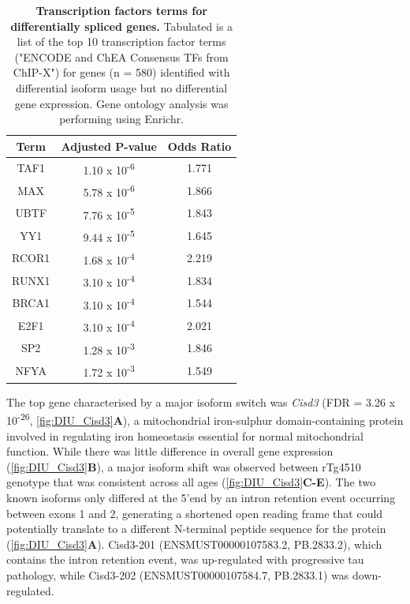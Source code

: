 \begin{table}[]
	\centering
	\captionsetup{width=0.95\textwidth,singlelinecheck=off}
	\caption[Transcription factors terms for differentially spliced genes]%
	{\textbf{Transcription factors terms for differentially spliced genes.} Tabulated is a list of the top 10 transcription factor terms ("ENCODE and ChEA Consensus TFs from ChIP-X") for genes (n = 580) identified with differential isoform usage but no differential gene expression. Gene ontology analysis was performing using Enrichr.}
	\label{tab: df_enrichr}
	\begin{tabular}{@{}ccc@{}}
		\toprule
		Term   & Adjusted P-value & Odds Ratio \\ \midrule
		TAF1   & 1.10 x 10\textsuperscript{-6}         & 1.771      \\
		MAX    & 5.78 x 10\textsuperscript{-6}         & 1.866      \\
		UBTF   & 7.76 x 10\textsuperscript{-5}          & 1.843      \\
		YY1    & 9.44 x 10\textsuperscript{-5}          & 1.645      \\
		RCOR1  & 1.68 x 10\textsuperscript{-4}         & 2.219      \\
		RUNX1  & 3.10 x 10\textsuperscript{-4}         & 1.834      \\
		BRCA1  & 3.10 x 10\textsuperscript{-4}         & 1.544      \\
		E2F1   & 3.10 x 10\textsuperscript{-4}         & 2.021      \\
		SP2    & 1.28 x 10\textsuperscript{-3}          & 1.846      \\
		NFYA   & 1.72 x 10\textsuperscript{-3}          & 1.549      \\ \bottomrule
	\end{tabular}
\end{table}

The top gene characterised by a major isoform switch was \textit{Cisd3} (FDR = 3.26 x 10\textsuperscript{-26}, \cref{fig:DIU_Cisd3}\textbf{A}), a mitochondrial iron-sulphur domain-containing protein involved in regulating iron homeostasis essential for normal mitochondrial function\cite{Wiley2007}. While there was little difference in overall gene expression (\cref{fig:DIU_Cisd3}\textbf{B}), a major isoform shift was observed between rTg4510 genotype that was consistent across all ages (\cref{fig:DIU_Cisd3}\textbf{C-E}). The two known isoforms only differed at the 5'end by an intron retention event occurring between exons 1 and 2, generating a shortened open reading frame that could potentially translate to a different N-terminal peptide sequence for the protein (\cref{fig:DIU_Cisd3}\textbf{A}). Cisd3-201 (ENSMUST00000107583.2, PB.2833.2), which contains the intron retention event, was up-regulated with progressive tau pathology, while Cisd3-202 (ENSMUST00000107584.7, PB.2833.1) was down-regulated.  

